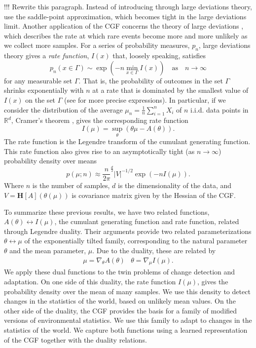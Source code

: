 \documentclass[10pt]{article}      %
\begin{document}
!!! Rewrite this paragraph. Instead of introducing through large deviations theory, use the saddle-point approximation, which becomes tight in the large deviations limit.
Another application of the CGF concerns the theory of large deviations \cite{dembo2009large}, which describes the rate at which rare events become more and more unlikely as we collect more samples. 
For a series of probability measures, $p_n$, large deviations theory gives a \textit{rate function}, $I(x)$ that, loosely speaking, satisfies
\begin{equation}
  p_n(x \in \Gamma) \sim \exp \left( - n \min_{x \in \Gamma} I(x) \right) \quad \textrm{as} \quad n \to \infty \label{def:large_deviations}
\end{equation}
for any measurable set $\Gamma$.
That is, the probability of outcomes in the set $\Gamma$ shrinks exponentially with $n$ at a rate that is dominated by the smallest value of $I(x)$ on the set $\Gamma$ (see \cite{dembo2009large} for more precise expressions).
In particular, if we consider the distribution of the average $\mu_n = \frac{1}{n} \sum_{i=1}^n X_i$ of $n$ i.i.d. data points in $\mathbb{R}^d$, Cramer's theorem \cite{dembo2009large}, gives the corresponding rate function
\begin{equation}
  I(\mu) = \sup_{\theta}( \theta \mu - A(\theta) ). \label{eq:legendre_transform}
\end{equation}
The rate function is the Legendre transform of the cumulant generating function.
This rate function also gives rise to an asymptotically tight (as $n \to \infty$) probability density over means \cite{iltis_sharp_1995,chaganty_multidimensional_1986}
\begin{equation}
  p(\mu; n) \approx \frac{n}{2\pi}^{\frac{d}{2}} |V|^{-1/2} \exp(-n I(\mu)). \label{def:mean_density}
\end{equation}
Where $n$ is the number of samples, $d$ is the dimensionality of the data, and $V = {\bm H}[A](\theta(\mu))$ is covariance matrix given by the Hessian of the CGF.


To summarize these previous results, we have two related functions, $A(\theta) \leftrightarrow I(\mu)$, the cumulant generating function and rate function, 
related through Legendre duality.
Their arguments provide two related parameterizations $\theta \leftrightarrow \mu$ of the exponentially tilted family, corresponding to the natural parameter $\theta$ and the mean parameter, $\mu$.
Due to the duality, these are related by 
\begin{eqnarray}
  \mu = \nabla_\theta A(\theta) & \theta = \nabla_\mu I(\mu). \label{eq:duality_relations}
\end{eqnarray}
We apply these dual functions to the twin problems of change detection and adaptation.
On one side of this duality, the rate function $I(\mu)$, gives the probability density over the mean of many samples.
We use this density to detect changes in the statistics of the world, based on unlikely mean values.
On the other side of the duality, the CGF provides the basis for a family of modified versions of environmental statistics.
We use this family to adapt to changes in the statistics of the world.
We capture both functions using a learned representation of the CGF together with the duality relations.
\end{document}
